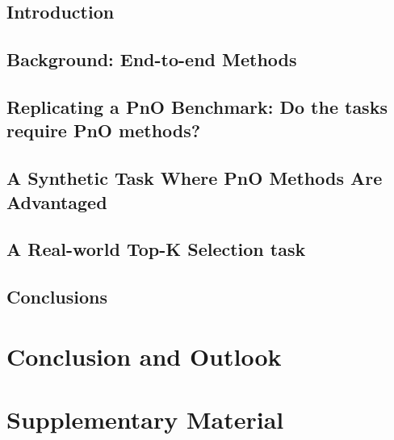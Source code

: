 \documentclass[11pt,final,letterpaper,openany]{mytuftsthesis}
\begin{document}
\section{Introduction}
\label{sec:dpo_intro}




\section{Background: End-to-end Methods}
\label{sec:dpo_methods}



\section{Replicating a PnO Benchmark: Do the tasks require PnO methods?}
\label{sec:bench_replication}



\section{A Synthetic Task Where PnO Methods Are Advantaged}
\label{sec:synth}






\section{A Real-world Top-K Selection task}
\label{sec:expt_topK}


\section{Conclusions}

\graphicspath{{./}}

\chapter{Conclusion and Outlook}


\chapter{Supplementary Material}






{
\singlespacing
\clearpage
{}
{}

}
\end{document}
